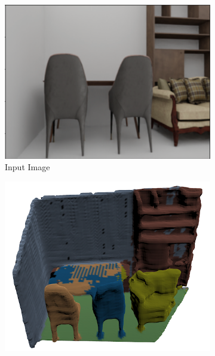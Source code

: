 \iffalse
\begin{figure}[t]
  \centering
  \begin{subfigure}{0.3\linewidth} %
    \centering
    \includegraphics[width=\linewidth]{figs/inputlim.png}
    \caption{Input Image}
    \label{subfig:limsub1}
  \end{subfigure}
  \hspace{0.02\linewidth} %
  \begin{subfigure}{0.3\linewidth} %
    \centering
    \includegraphics[width=\linewidth]{figs/panolim.png}

\end{subfigure}
\end{figure}
